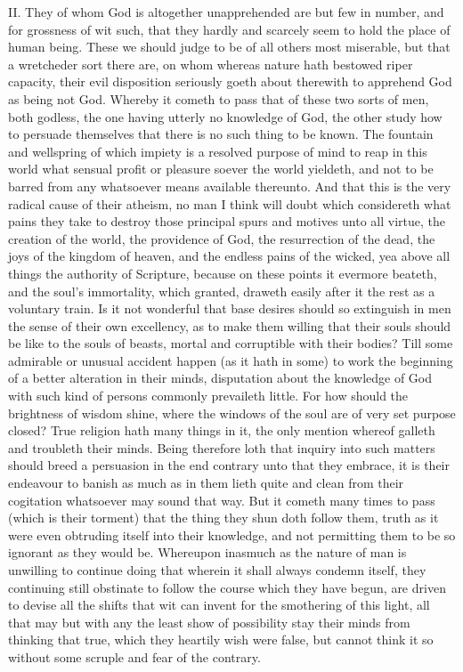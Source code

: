 II. They of whom God is altogether unapprehended are but few in number, and for grossness of wit such, that they hardly and scarcely seem to hold the place of human being. These we should judge to be of all others most miserable, but that a wretcheder sort there are, on whom whereas nature hath bestowed riper capacity, their evil disposition seriously goeth about therewith to apprehend God as being not God. Whereby it cometh to pass that of these two sorts of men, both godless, the one having utterly no knowledge of God, the other study how to persuade themselves that there is no such thing to be known. The fountain and wellspring of which impiety is a resolved purpose of mind to reap in this world what sensual profit or pleasure soever the world yieldeth, and not to be barred from any whatsoever means available thereunto. And that this is the very radical cause of their atheism, no man I think will doubt which considereth what pains they take to destroy those principal spurs and motives unto all virtue, the creation of the world, the providence of God, the resurrection of the dead, the joys of the kingdom of heaven, and the endless pains of the wicked, yea above all things the authority of Scripture, because on these points it evermore beateth, and the soul’s immortality, which granted, draweth easily after it the rest as a voluntary train. Is it not wonderful that base desires should so extinguish in men the sense of their own excellency, as to make them willing that their souls should be like to the souls of beasts, mortal and corruptible with their bodies? Till some admirable or unusual accident happen (as it hath in some) to work the beginning of a better alteration in their minds, disputation about the  knowledge of God with such kind of persons commonly prevaileth little. For how should the brightness of wisdom shine, where the windows of the soul are of very set purpose closed? True religion hath many things in it, the only mention whereof galleth and troubleth their minds. Being therefore loth that inquiry into such matters should breed a persuasion in the end contrary unto that they embrace, it is their endeavour to banish as much as in them lieth quite and clean from their cogitation whatsoever may sound that way.
But it cometh many times to pass (which is their torment) that the thing they shun doth follow them, truth as it were even obtruding itself into their knowledge, and not permitting them to be so ignorant as they would be. Whereupon inasmuch as the nature of man is unwilling to continue doing that wherein it shall always condemn itself, they continuing still obstinate to follow the course which they have begun, are driven to devise all the shifts that wit can invent for the smothering of this light, all that may but with any the least show of possibility stay their minds from thinking that true, which they heartily wish were false, but cannot think it so without some scruple and fear of the contrary.
